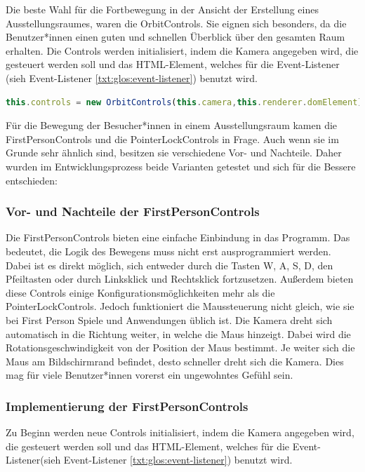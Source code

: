 Die beste Wahl für die Fortbewegung in der Ansicht der Erstellung eines Ausstellungsraumes, waren die OrbitControls. Sie eignen sich besonders, da die Benutzer*innen einen guten und schnellen Überblick über den gesamten Raum erhalten.
Die Controls werden initialisiert, indem die Kamera angegeben wird, die gesteuert werden soll und das HTML-Element, welches für die Event-Listener (sieh Event-Listener \ref{txt:glos:event-listener}) benutzt wird.

\begin{lstlisting}[caption={OrbitControls initialisieren},language=TypeScript]
    this.controls = new OrbitControls(this.camera,this.renderer.domElement)
    \end{lstlisting}

Für die Bewegung der Besucher*innen in einem Ausstellungsraum kamen die FirstPersonControls und die PointerLockControls in Frage. Auch wenn sie im Grunde sehr ähnlich sind, besitzen sie verschiedene Vor- und Nachteile. Daher wurden im Entwicklungsprozess beide Varianten getestet und sich für die Bessere entschieden:

\subsubsection{Vor- und Nachteile der FirstPersonControls}

Die FirstPersonControls bieten eine einfache Einbindung in das Programm. Das bedeutet, die Logik des Bewegens muss nicht erst ausprogrammiert werden. Dabei ist es direkt möglich, sich entweder durch die Tasten W, A, S, D, den Pfeiltasten oder durch Linksklick und Rechtsklick fortzusetzen. Außerdem bieten diese Controls einige Konfigurationsmöglichkeiten mehr als die PointerLockControls. Jedoch funktioniert die Maussteuerung nicht gleich, wie sie bei First Person Spiele und Anwendungen üblich ist. Die Kamera dreht sich automatisch in die Richtung weiter, in welche die Maus hinzeigt. Dabei wird die Rotationsgeschwindigkeit von der Position der Maus bestimmt. Je weiter sich die Maus am Bildschirmrand befindet, desto schneller dreht sich die Kamera. Dies mag für viele Benutzer*innen vorerst ein ungewohntes Gefühl sein.

\subsubsection{Implementierung der FirstPersonControls}
Zu Beginn werden neue Controls initialisiert, indem die Kamera angegeben wird, die gesteuert werden soll und das HTML-Element, welches für die Event-Listener(sieh Event-Listener \ref{txt:glos:event-listener}) benutzt wird. 


